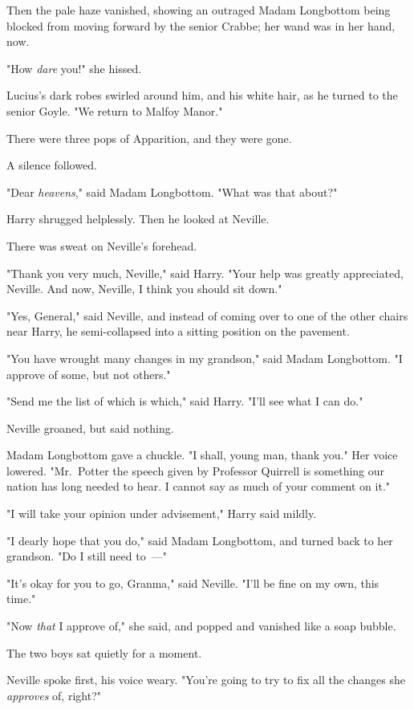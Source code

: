 Then the pale haze vanished, showing an outraged Madam Longbottom being blocked
from moving forward by the senior Crabbe; her wand was in her hand, now.

"How \emph{dare} you!" she hissed.

Lucius's dark robes swirled around him, and his white hair, as he turned to the
senior Goyle. "We return to Malfoy Manor."

There were three pops of Apparition, and they were gone.

A silence followed.

"Dear \emph{heavens}," said Madam Longbottom. "What was that about?"

Harry shrugged helplessly. Then he looked at Neville.

There was sweat on Neville's forehead.

"Thank you very much, Neville," said Harry. "Your help was greatly appreciated,
Neville. And now, Neville, I think you should sit down."

"Yes, General," said Neville, and instead of coming over to one of the other
chairs near Harry, he semi-collapsed into a sitting position on the pavement.

"You have wrought many changes in my grandson," said Madam Longbottom. "I
approve of some, but not others."

"Send me the list of which is which," said Harry. "I'll see what I can do."

Neville groaned, but said nothing.

Madam Longbottom gave a chuckle. "I shall, young man, thank you." Her voice
lowered. "Mr.~Potter{\el} the speech given by Professor Quirrell is
something our nation has long needed to hear. I cannot say as much of your
comment on it."

"I will take your opinion under advisement," Harry said mildly.

"I dearly hope that you do," said Madam Longbottom, and turned back to her
grandson. "Do I still need to~---"

"It's okay for you to go, Granma," said Neville. "I'll be fine on my own, this
time."

"Now \emph{that} I approve of," she said, and popped and vanished like a soap
bubble.

The two boys sat quietly for a moment.

Neville spoke first, his voice weary. "You're going to try to fix all the
changes she \emph{approves} of, right?"

